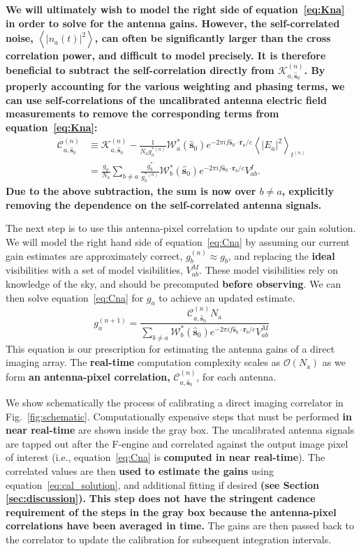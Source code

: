\documentclass[a4paper,fleqn,usenatbib]{../mnras}
\newcommand{\Nant}{\ensuremath{N_{\mathrm{a}}}}
\newcommand{\spix}{\ensuremath{\hat{\mathbf{s}}_{0}}}
\newcommand{\Cna}[1][n]{\ensuremath{\mathcal{C}^{(#1)}_{a,\spix}}}
\newcommand{\Kna}[1][n]{\ensuremath{\mathcal{K}^{(#1)}_{a,\spix}}}
\newcommand{\ra}{\ensuremath{\mathbf{r}_a}}
\newcommand{\rb}{\ensuremath{\mathbf{r}_b}}
\begin{document}
\textbf{We will ultimately wish to model the right side of equation~\ref{eq:Kna} in order to solve for the
antenna gains. However, the self-correlated noise, $\left<|n_a(t)|^2\right>$, can often be 
significantly larger than the cross correlation power, and difficult to model precisely. It 
is therefore beneficial to subtract the self-correlation directly from $\Kna$. By properly
accounting for the various weighting and phasing terms, we can use self-correlations of the
uncalibrated antenna electric field measurements to remove the corresponding
terms from equation~\ref{eq:Kna}:}
\begin{align}\label{eq:Cna}
\Cna & \equiv \Kna - \frac{1}{\Nant g^{*(n)}_a}\mathcal{W}^*_a(\spix)e^{-2\pi i f\spix \cdot \ra/c} \left<|E_a|^2\right>_{t^{(n)}}\nonumber \\
& = \frac{g_a}{\Nant} \sum_{b\ne a} \frac{g^*_b}{g^{*(n)}_b} \mathcal{W}^*_b(\spix) e^{-2\pi i f\spix \cdot \rb/c} V^I_{ab}.
\end{align}
\textbf{Due to the above subtraction, the sum is now over $b \ne a$, explicitly removing the
dependence on the self-correlated antenna signals.}

The next step is to use this antenna-pixel correlation to update our gain solution. We will model 
the right hand side of equation~\ref{eq:Cna} by assuming our current gain estimates are 
approximately correct, $g^{(n)}_b\approx g_b$, and replacing the \textbf{ideal} visibilities with a set of 
model visibilities, $V^M_{ab}$. These model visibilities rely on knowledge of the sky, and should 
be precomputed \textbf{before observing}. We can then solve equation~\ref{eq:Cna} for $g_a$ to achieve an 
updated estimate.
\begin{equation}\label{eq:cal_solution}
g^{(n+1)}_a = \frac{\Cna \Nant }{ \sum_{b\ne a} \mathcal{W}^*_b(\spix) e^{-2\pi i f\spix \cdot \rb/c} V^M_{ab} }
\end{equation}
This equation is our prescription for estimating the antenna gains of a direct imaging array. The 
\textbf{real-time} computation complexity scales as $\mathcal{O}(\Nant)$ as we form 
\textbf{an antenna-pixel correlation,} $\Cna$, for each 
antenna. 

We show schematically the process of calibrating a direct imaging correlator in 
Fig.~\ref{fig:schematic}. Computationally expensive steps that must be performed \textbf{in near real-time} 
are shown inside the gray box. The uncalibrated antenna signals are tapped out after the 
F-engine and correlated against the output image pixel of interest (i.e., equation~\ref{eq:Cna} is 
\textbf{computed in near real-time}). The correlated values are then \textbf{used to estimate the gains}
using equation~\ref{eq:cal_solution}, and additional fitting if desired 
\textbf{(see Section \ref{sec:discussion}).}
\textbf{This step does not have
the stringent cadence requirement of the steps in the gray box because the 
antenna-pixel correlations have been 
averaged in time.}
The gains are then passed back 
to the correlator to update the calibration for subsequent integration intervals. 
\end{document}
